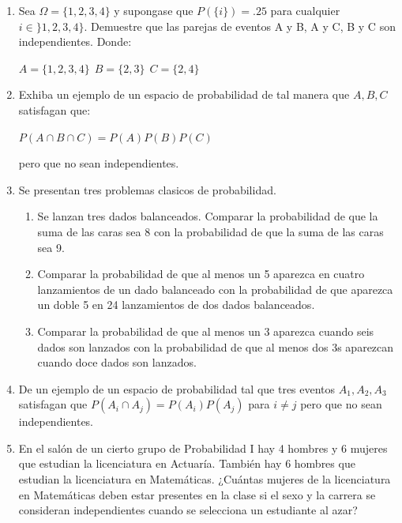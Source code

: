 \documentclass[12pt,a4paper]{report}
\begin{document}
\begin{enumerate}
   \item {
    Sea $\Omega = \lbrace 1,2,3,4 \rbrace$ y supongase que $P(\lbrace i \rbrace)=.25$ para cualquier $i\in \rbrace 1,2,3,4 \rbrace$. Demuestre que las parejas de eventos A y B, A y C, B y C son independientes. Donde:\\
    \begin{center}
    $A=\lbrace 1,2,3,4 \rbrace \ \ B=\lbrace 2,3 \rbrace \ \ C= \lbrace 2,4 \rbrace $
\end{center}     
	}

   \item {
  Exhiba un ejemplo de un espacio de probabilidad de tal manera que $A,B,C$ satisfagan que: \\ 
  \begin{center}
  $P(A\cap B \cap C) = P(A)P(B)P(C)$
  \end{center}
  pero que no sean independientes.
	}

   \item {
    Se presentan tres problemas clasicos de probabilidad. 
    
    \begin{enumerate}[label=\alph*) ]
    \item{Se lanzan tres dados balanceados. Comparar la probabilidad de que la suma de las caras sea 8 con la probabilidad de que la suma de las caras sea 9.
    }\\ 
    
    \item{Comparar la probabilidad de que al menos un 5 aparezca en cuatro lanzamientos de un dado balanceado con la probabilidad de que aparezca un doble 5 en 24 lanzamientos de dos dados balanceados.} \\
    \item{Comparar la probabilidad de que al menos un 3 aparezca cuando seis dados son lanzados con la probabilidad de que al menos dos 3s aparezcan cuando doce dados son lanzados.}
    \end{enumerate}
	}


   \item {
   De un ejemplo de un espacio de probabilidad tal que tres eventos $A_{1},A_{2},A_{3}$ satisfagan que $P(A_{i}\cap A_{j})=P(A_{i})P(A_{j})$ para $i\neq j$ pero que no sean independientes.\\
	}

   \item {En el salón de un cierto grupo de Probabilidad I hay 4 hombres y 6 mujeres que estudian la licenciatura en Actuaría. También hay 6 hombres que estudian la licenciatura en Matemáticas. ¿Cuántas mujeres de la licenciatura en Matemáticas deben estar presentes en la clase si el sexo y la carrera se consideran independientes cuando se selecciona un estudiante al azar?	
	}


\end{enumerate}
\end{document}
